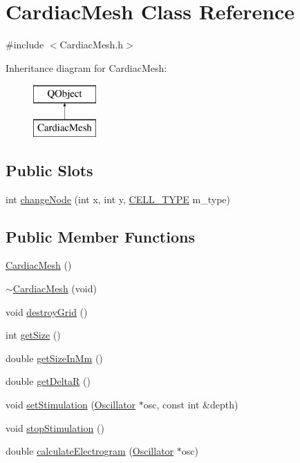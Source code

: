\hypertarget{class_cardiac_mesh}{\section{Cardiac\+Mesh Class Reference}
\label{class_cardiac_mesh}
}


{\ttfamily \#include $<$Cardiac\+Mesh.\+h$>$}

Inheritance diagram for Cardiac\+Mesh\+:\begin{figure}[H]
\begin{center}
\leavevmode
\includegraphics[height=2.000000cm]{class_cardiac_mesh}
\end{center}
\end{figure}
\subsection*{Public Slots}
\begin{DoxyCompactItemize}
\item 
int \hyperlink{class_cardiac_mesh_a5131c310815bf636bd6de60e61dc7c5e}{change\+Node} (int x, int y, \hyperlink{heart_defines_8h_a2f059cd81f362503874790462d535f5b}{C\+E\+L\+L\+\_\+\+T\+Y\+P\+E} m\+\_\+type)
\end{DoxyCompactItemize}
\subsection*{Public Member Functions}
\begin{DoxyCompactItemize}
\item 
\hyperlink{class_cardiac_mesh_a864c30e0e6cdab5e1a1e39ab99a45e5b}{Cardiac\+Mesh} ()
\item 
\hyperlink{class_cardiac_mesh_a91b0200d15669cbdef50c3d8a6ad523f}{$\sim$\+Cardiac\+Mesh} (void)
\item 
void \hyperlink{class_cardiac_mesh_ac4e6a0774e1b1abf2ddbf2cc59434a92}{destroy\+Grid} ()
\item 
int \hyperlink{class_cardiac_mesh_afabd19504c5ea0168100a86205b3ccb6}{get\+Size} ()
\item 
double \hyperlink{class_cardiac_mesh_a67e146331d7c41e3d528861594ac577e}{get\+Size\+In\+Mm} ()
\item 
double \hyperlink{class_cardiac_mesh_ab4705e8f6f5657337295f076494e9a45}{get\+Delta\+R} ()
\item 
void \hyperlink{class_cardiac_mesh_a22bc3080340bc2ecad69e151098edaf5}{set\+Stimulation} (\hyperlink{class_oscillator}{Oscillator} $\ast$osc, const int \&depth)
\item 
void \hyperlink{class_cardiac_mesh_a5b11cbba123533dcf60e5bf1a7bba9cc}{stop\+Stimulation} ()
\item 
double \hyperlink{class_cardiac_mesh_abf74825fdb7bc14445c25877f06e36af}{calculate\+Electrogram} (\hyperlink{class_oscillator}{Oscillator} $\ast$osc)
\end{DoxyCompactItemize}
